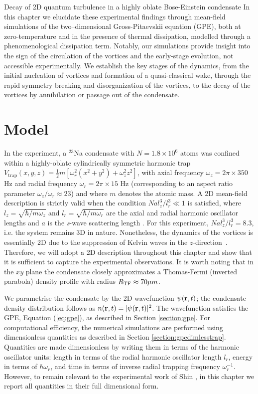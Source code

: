 \begin{chapter}{\label{cha:shin}Decay of 2D quantum turbulence in a highly oblate Bose-Einstein condensate}
 In this chapter we elucidate these experimental
findings through mean-field simulations of the two--dimensional Gross-Pitaevskii equation (GPE), both at zero-temperature and in the presence of 
thermal dissipation, modelled through a phenomenological dissipation term.  Notably, our simulations provide insight into the sign of the circulation of the vortices and the early-stage evolution, not accessible experimentally.  We establish the key stages of the dynamics, from the initial nucleation of vortices and formation of a quasi-classical wake, through the rapid symmetry breaking and disorganization of the vortices, to the decay of the vortices by annihilation or passage out of the condensate.  

\section{Model}
In the experiment, a $^{23}$Na condensate with $N=1.8\times 10^6$ atoms was confined within a highly-oblate cylindrically symmetric harmonic trap $V_{\mathrm{trap}}(x,y,z)=\frac{1}{2}m[\omega_r^2 (x^2+y^2) +\omega_z^2 z^2 ]$, with axial frequency $\omega_z=2 \pi \times 350$ Hz and radial frequency $\omega_r=2\pi \times 15$ Hz (corresponding to an aspect ratio parameter $\omega_z/\omega_r \approx 23$) and where $m$ denotes the atomic mass.  
A 2D mean-field description is strictly valid when 
the condition $N a l_z^3/l_r^3 \ll 1$ is satisfied, 
where $l_z=\sqrt{\hbar/m \omega_z}$ and $l_r=\sqrt{\hbar/m\omega_r}$ 
are the axial and radial harmonic oscillator lengths and $a$ is 
the {\it s}-wave scattering length \cite{delgado,parker2008}.  
For this experiment, $N a l_z^3/l_r^3=8.3$, i.e. the system remains 
3D in nature.   Nonetheless, the dynamics of the vortices is essentially 2D 
due to the suppression of Kelvin waves in 
the $z$-direction~\citep{jackson_proukakis_09}.  
Therefore, we will adopt a 2D description throughout this chapter and 
show that it is sufficient to capture the experimental observations.  
It is worth noting that in the $xy$ plane the condensate 
closely approximates a Thomas-Fermi (inverted parabola) density 
profile with radius $R_{\rm TF}\approx70 \mu m$.

We parametrise the condensate by the 2D wavefunction $\psi({\bf r},t)$; the condensate density distribution follows as $n({\bf r},t)=|\psi({\bf r},t)|^2$.  The wavefunction satisfies the GPE, Equation (\ref{eq:gpe}), as described in Section \ref{section:gpe}. For computational efficiency, the numerical simulations are performed using dimensionless quantities as described in Section \ref{section:gpedimlesstrap}. Quantities are made dimensionless by writing them in terms of the harmonic oscillator units: length in terms of the radial harmonic oscillator length $l_r$, energy in terms of $\hbar\omega_r$, and time in terms of inverse radial trapping frequency $\omega_r^{-1}$. However, to remain relevant to the experimental work of Shin \etal, in this chapter we report all quantities in their full dimensional form.


\end{chapter}
